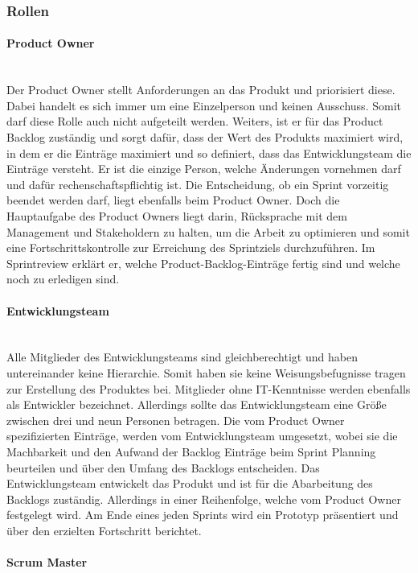 \subsubsection{Rollen}   
\paragraph{Product Owner}\\

Der Product Owner stellt Anforderungen an das Produkt und priorisiert diese. Dabei handelt es sich immer um eine Einzelperson und keinen Ausschuss. Somit darf diese Rolle auch nicht aufgeteilt werden. Weiters, ist er für das Product Backlog zuständig und sorgt dafür, dass der Wert des Produkts maximiert wird, in dem er die Einträge maximiert und so definiert, dass das Entwicklungsteam die Einträge versteht. Er ist die einzige Person, welche Änderungen vornehmen darf und dafür rechenschaftspflichtig ist. Die Entscheidung, ob ein Sprint vorzeitig beendet werden darf, liegt ebenfalls beim Product Owner. Doch die Hauptaufgabe des Product Owners liegt darin, Rücksprache mit dem Management und Stakeholdern zu halten, um die Arbeit zu optimieren und somit eine Fortschrittskontrolle zur Erreichung des Sprintziels durchzuführen. Im Sprintreview erklärt er, welche Product-Backlog-Einträge fertig sind und welche noch zu erledigen sind. 

\paragraph{Entwicklungsteam}
\\
Alle Mitglieder des Entwicklungsteams sind gleichberechtigt und haben untereinander keine Hierarchie. Somit haben sie keine Weisungsbefugnisse tragen zur Erstellung des Produktes bei. Mitglieder ohne IT-Kenntnisse werden ebenfalls als Entwickler bezeichnet. Allerdings sollte das Entwicklungsteam eine Größe zwischen drei und neun Personen betragen. Die vom Product Owner spezifizierten Einträge, werden vom Entwicklungsteam umgesetzt, wobei sie die Machbarkeit und den Aufwand der Backlog Einträge beim Sprint Planning beurteilen und über den Umfang des Backlogs entscheiden. Das Entwicklungsteam entwickelt das Produkt und ist für die Abarbeitung des Backlogs zuständig. Allerdings in einer Reihenfolge, welche vom Product Owner festgelegt wird. Am Ende eines jeden Sprints wird ein Prototyp präsentiert und über den erzielten Fortschritt berichtet. 

\paragraph{Scrum Master}\\

